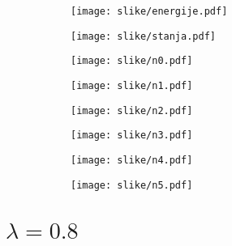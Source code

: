 \documentclass{article}
\begin{document}
\begin{figure}[H]
\begin{subfigure}{.5\textwidth}
\texttt{[image: slike/energije.pdf]}
\end{subfigure}
\begin{subfigure}{.5\textwidth}
\texttt{[image: slike/stanja.pdf]}
\end{subfigure}
\end{figure}
\begin{figure}[H]
\begin{subfigure}{.5\textwidth}
\texttt{[image: slike/n0.pdf]}
\end{subfigure}
\begin{subfigure}{.5\textwidth}
\texttt{[image: slike/n1.pdf]}
\end{subfigure}
\end{figure}
\begin{figure}[H]
\begin{subfigure}{.5\textwidth}
\texttt{[image: slike/n2.pdf]}
\end{subfigure}
\begin{subfigure}{.5\textwidth}
\texttt{[image: slike/n3.pdf]}
\end{subfigure}
\end{figure}
\begin{figure}[H]
\begin{subfigure}{.5\textwidth}
\texttt{[image: slike/n4.pdf]}
\end{subfigure}
\begin{subfigure}{.5\textwidth}
\texttt{[image: slike/n5.pdf]}
\end{subfigure}
\end{figure}	

\section{$\lambda = 0.8$}
\end{document}
